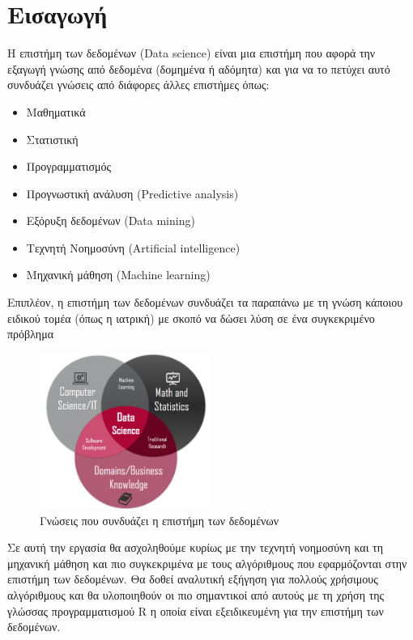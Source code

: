 \newpage
\section{Εισαγωγή}
Η επιστήμη των δεδομένων (\textlatin{Data science}) είναι
μια επιστήμη που αφορά την εξαγωγή γνώσης από δεδομένα
(δομημένα ή αδόμητα) και για να το πετύχει αυτό συνδυάζει
γνώσεις από διάφορες άλλες επιστήμες όπως:
\begin{itemize}
    \item Μαθηματικά
    \item Στατιστική
    \item Προγραμματισμός
    \item Προγνωστική ανάλυση (\textlatin{Predictive analysis})
    \item Εξόρυξη δεδομένων (\textlatin{Data mining})
    \item Τεχνητή Νοημοσύνη (\textlatin{Artificial intelligence})
    \item Μηχανική μάθηση (\textlatin{Machine learning})
\end{itemize}
Επιπλέον, η επιστήμη των δεδομένων συνδυάζει τα παραπάνω με
τη γνώση κάποιου ειδικού τομέα (όπως η ιατρική) με σκοπό να
δώσει λύση σε ένα συγκεκριμένο πρόβλημα \cite{wikiDS}
\begin{figure}[H]
    \centering
    \includegraphics[width=0.5\textwidth]{images/dataScienceKnowledge.png}
    \caption{Γνώσεις που συνδυάζει η επιστήμη των δεδομένων}
\end{figure}

Σε αυτή την εργασία θα ασχοληθούμε κυρίως με την τεχνητή
νοημοσύνη και τη μηχανική μάθηση και πιο συγκεκριμένα με τους
αλγόριθμους που εφαρμόζονται στην επιστήμη των δεδομένων.
Θα δοθεί αναλυτική εξήγηση για πολλούς χρήσιμους αλγόριθμους
και θα υλοποιηθούν οι πιο σημαντικοί από αυτούς με τη χρήση
της γλώσσας προγραμματισμού \textlatin{R} η οποία είναι
εξειδικευμένη για την επιστήμη των δεδομένων.

